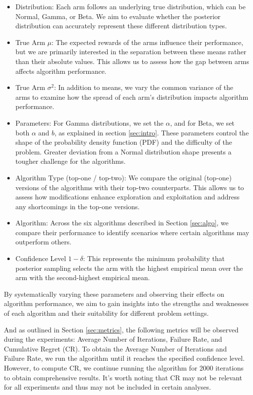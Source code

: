 \documentclass[a4paper, 12pt]{article}
\theoremstyle{definition}
\begin{document}
\begin{itemize}
\item Distribution: Each arm follows an underlying true distribution, which can be Normal, Gamma, or Beta. We aim to evaluate whether the posterior distribution can accurately represent these different distribution types.
\item True Arm $\mu$: The expected rewards of the arms influence their performance, but we are primarily interested in the separation between these means rather than their absolute values. This allows us to assess how the gap between arms affects algorithm performance.
\item True Arm $\sigma^2$: In addition to means, we vary the common variance of the arms to examine how the spread of each arm's distribution impacts algorithm performance.
\item Parameters: For Gamma distributions, we set the $\alpha$, and for Beta, we set both $\alpha$ and $b$, as explained in section \ref{sec:intro}. These parameters control the shape of the probability density function (PDF) and the difficulty of the problem. Greater deviation from a Normal distribution shape presents a tougher challenge for the algorithms.
\item Algorithm Type (top-one / top-two): We compare the original (top-one) versions of the algorithms with their top-two counterparts. This allows us to assess how modifications enhance exploration and exploitation and address any shortcomings in the top-one versions.
\item Algorithm: Across the six algorithms described in Section \ref{sec:algo}, we compare their performance to identify scenarios where certain algorithms may outperform others.
\item Confidence Level $1-\delta$: This represents the minimum probability that posterior sampling selects the arm with the highest empirical mean over the arm with the second-highest empirical mean.
\end{itemize}

By systematically varying these parameters and observing their effects on algorithm performance, we aim to gain insights into the strengths and weaknesses of each algorithm and their suitability for different problem settings.

And as outlined in Section \ref{sec:metrics}, the following metrics will be observed during the experiments: Average Number of Iterations, Failure Rate, and Cumulative Regret (CR). To obtain the Average Number of Iterations and Failure Rate, we run the algorithm until it reaches the specified confidence level. However, to compute CR, we continue running the algorithm for 2000 iterations to obtain comprehensive results. It's worth noting that CR may not be relevant for all experiments and thus may not be included in certain analyses.
\end{document}
